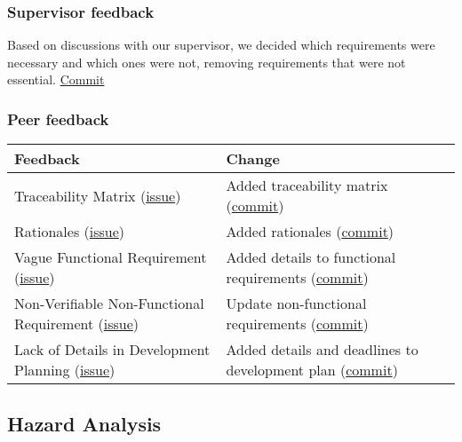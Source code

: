 \documentclass{article}
\begin{document}
\subsubsection{Supervisor feedback}
Based on discussions with our supervisor, we decided which requirements were necessary and which ones were not, removing requirements that were not essential. \href{https://github.com/AidanMariglia/SOCAlgoTestPlatform/pull/174}{Commit}

\subsubsection{Peer feedback} 

\begin{tabularx}{\textwidth}{X|X}
    \toprule
    \textbf{Feedback} & \textbf{Change}\\
    \midrule
    Traceability Matrix
    (\href{https://github.com/AidanMariglia/SOCAlgoTestPlatform/issues/9}{issue}) & 
    Added traceability matrix (\href{https://github.com/AidanMariglia/SOCAlgoTestPlatform/pull/174}{commit}) \\
    \midrule
    Rationales
    (\href{https://github.com/AidanMariglia/SOCAlgoTestPlatform/issues/10}{issue}) & Added rationales (\href{https://github.com/AidanMariglia/SOCAlgoTestPlatform/pull/174}{commit}) \\
    \midrule
    Vague Functional Requirement (\href{https://github.com/AidanMariglia/SOCAlgoTestPlatform/issues/11}{issue}) & Added details to functional requirements (\href{https://github.com/AidanMariglia/SOCAlgoTestPlatform/pull/174}{commit}) \\
    \midrule
    Non-Verifiable Non-Functional Requirement (\href{https://github.com/AidanMariglia/SOCAlgoTestPlatform/issues/12}{issue}) & Update non-functional requirements (\href{https://github.com/AidanMariglia/SOCAlgoTestPlatform/pull/174}{commit}) \\
    \midrule
    Lack of Details in Development Planning (\href{https://github.com/AidanMariglia/SOCAlgoTestPlatform/issues/13}{issue}) & 
    Added details and deadlines to development plan (\href{https://github.com/AidanMariglia/SOCAlgoTestPlatform/pull/174}{commit}) \\
    \bottomrule
\end{tabularx}


\subsection{Hazard Analysis}
\end{document}
